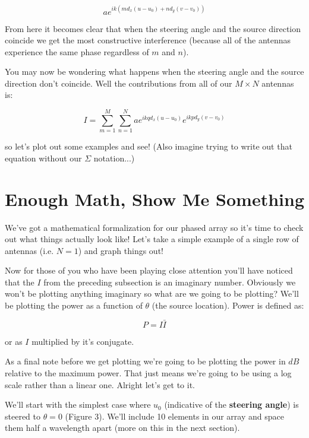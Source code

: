 \documentclass[12pt,a6paper]{book}
\begin{document}
\begin{equation}
ae^{ik(md_x(u-u_0)+nd_y(v-v_0))}
\end{equation}

From here it becomes clear that when the steering angle and the source direction coincide we get the most constructive interference (because all of the antennas experience the same phase regardless of $m$ and $n$).

You may now be wondering what happens when the steering angle and the source direction don't coincide. Well the contributions from all of our $M\times N$ antennas is:

\begin{equation}
I=\sum_{m=1}^M \sum_{n=1}^N  ae^{ikqd_x(u-u_0)}e^{ikpd_y(v-v_0)}
\end{equation}

so let's plot out some examples and see! (Also imagine trying to write out that equation without our $\Sigma$ notation...)

\section{Enough Math, Show Me Something}
We've got a mathematical formalization for our phased array so it's time to check out what things actually look like! Let's take a simple example of a single row of antennas (i.e. $N=1$) and graph things out!

Now for those of you who have been playing close attention you'll have noticed that the $I$ from the preceding subsection is an imaginary number. Obviously we won't be plotting anything imaginary so what are we going to be plotting? We'll be plotting the power as a function of $\theta$ (the source location). Power is defined as:

\begin{equation}
P=I\bar{I}
\end{equation}

or as $I$ multiplied by it's conjugate. 

As a final note before we get plotting we're going to be plotting the power in $dB$ relative to the maximum power. That just means we're going to be using a log scale rather than a linear one. Alright let's get to it.

We'll start with the simplest case where $u_0$ (indicative of the \textbf{steering angle}) is steered to $\theta=0$ (Figure 3). We'll include 10 elements in our array and space them half a wavelength apart (more on this in the next section). 
\end{document}
